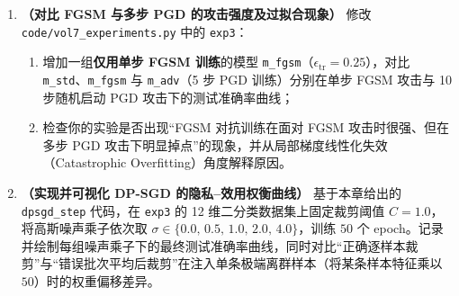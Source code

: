 \begin{enumerate}[label=\textbf{7.3.\arabic*}, start=5]
  \item \textbf{（对比 FGSM 与多步 PGD 的攻击强度及过拟合现象）} 修改 \texttt{code/vol7\_experiments.py} 中的 \texttt{exp3}：
  \begin{enumerate}
    \item 增加一组\textbf{仅用单步 FGSM 训练}的模型 \texttt{m\_fgsm}（$\epsilon_{\text{tr}}=0.25$），对比 \texttt{m\_std}、\texttt{m\_fgsm} 与 \texttt{m\_adv}（5 步 PGD 训练）分别在单步 FGSM 攻击与 10 步随机启动 PGD 攻击下的测试准确率曲线；
    \item 检查你的实验是否出现“FGSM 对抗训练在面对 FGSM 攻击时很强、但在多步 PGD 攻击下明显掉点”的现象，并从局部梯度线性化失效（Catastrophic Overfitting）角度解释原因。
  \end{enumerate}

  \item \textbf{（实现并可视化 DP-SGD 的隐私--效用权衡曲线）} 基于本章给出的 \texttt{dpsgd\_step} 代码，在 \texttt{exp3} 的 12 维二分类数据集上固定裁剪阈值 $C = 1.0$，将高斯噪声乘子依次取 $\sigma \in \{0.0,\, 0.5,\, 1.0,\, 2.0,\, 4.0\}$，训练 $50$ 个 epoch。记录并绘制每组噪声乘子下的最终测试准确率曲线，同时对比“正确逐样本裁剪”与“错误批次平均后裁剪”在注入单条极端离群样本（将某条样本特征乘以 $50$）时的权重偏移差异。
\end{enumerate}


